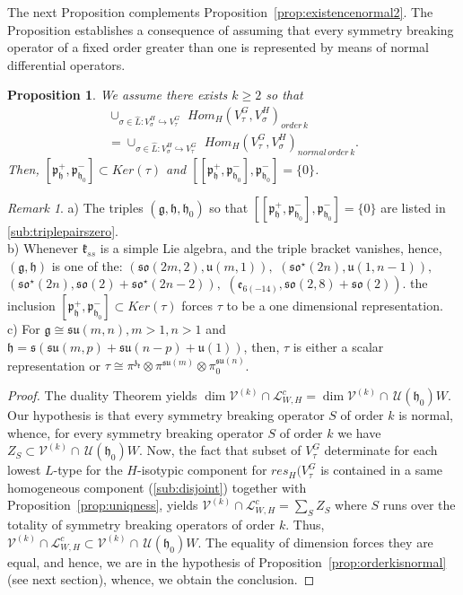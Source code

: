 \documentclass[12pt]{amsart}
\newtheorem{prop}[thm]{Proposition}
\theoremstyle{definition}
\theoremstyle{remark}
\newtheorem{rmk}[thm]{Remark}
\newcommand{\g}{\mathfrak{g}}
\newcommand{\h}{\mathfrak{h}}
\renewcommand{\k}{{\mathfrak k}}
\newcommand{\p}{\mathfrak p}
\newcommand{\s}{\mathfrak s}
\newcommand{\z}{\mathfrak z}
\renewcommand{\u}{{\mathfrak u}}
\numberwithin{equation}{section}
\begin{document}
\smallskip
The next Proposition complements Proposition~\ref{prop:existencenormal2}.
  The Proposition  establishes a   consequence of assuming that every symmetry breaking operator of a fixed order greater than one is represented by means of normal differential operators.
\begin{prop}\label{prop:everynorfortriple}We assume there exists $k\geq 2$ so that  \begin{multline*} \cup_{\sigma \in \widehat L: V_\sigma^H \hookrightarrow V_\tau^G}\,\,    Hom_H( V_\tau^G, V_\sigma^H)_{order\, k} \\ = \cup_{\sigma \in \widehat L: V_\sigma^H \hookrightarrow V_\tau^G}\,\,    Hom_H( V_\tau^G, V_\sigma^H)_{normal\, order\, k}.\end{multline*}
Then,  $[\p_\h^+, \p_{\h_0}^-] \subset Ker(\tau)$ and $[[\p_\h^+, \p_{\h_0}^-], \p_{\h_0}^-]=\{0\}$.
\end{prop}
\begin{rmk}a) The triples $(\g, \h, \h_0)$ so that $[[\p_\h^+, \p_{\h_0}^-], \p_{\h_0}^-]=\{0\}$ are listed in \ref{sub:triplepairszero}. \\ b) Whenever $\k_{ss}$ is a simple Lie algebra, and the triple bracket vanishes,  hence, $(\g,\h)$ is one of the: $(\mathfrak{so}(2m,2), \mathfrak u(m,1)),$   $(\mathfrak{so}^\star (2n), \mathfrak u(1,n-1)),$ $(\mathfrak{so}^\star(2n),  \mathfrak{so}(2) +\mathfrak{so}^\star(2n-2)),$
$(\mathfrak e_{6(-14)}, \mathfrak{so}(2,8)+\mathfrak{so}(2)).$   the inclusion $[\p_\h^+, \p_{\h_0}^-] \subset Ker(\tau)$  forces   $\tau$ to be a one dimensional representation. \\ c)  For $\g\cong \mathfrak{su}(m,n), m>1,n>1 $ and  $\h=\s(\mathfrak{su}(m,p)+\mathfrak{su}(n-p)+\u(1))$,  then,  $\tau$ is either a scalar representation or $\tau \cong \pi^{\z_\k}\otimes \pi^{\mathfrak{su}(m)}\otimes \pi_0^{\mathfrak{su}(n)}$.
\end{rmk}
\begin{proof} The duality Theorem \cite[Theorem 1]{OV3} \cite[Theorem 4.6]{OV4} yields $\dim \mathcal V^{(k)} \cap \mathcal L_{W,H}^c= \dim \mathcal V^{(k)}\cap \, \mathcal U(\h_0)W$. Our hypothesis is that every symmetry breaking operator $S$ of order $k$ is normal, whence,   for every symmetry breaking operator $S$ of order $k$ we have  $Z_S \subset \mathcal V^{(k)}\cap \, \mathcal U(\h_0)W$. Now, the fact that  subset of $V_\tau^G$ determinate for each lowest $L$-type for the $H$-isotypic component for $res_H(V_\tau^G$ is contained in a same  homogeneous  component (\ref{sub:disjoint}) together with Proposition~\ref{prop:uniqness}, yields $\mathcal V^{(k)} \cap \mathcal L_{W,H}^c=\sum_S Z_S$ where $S$ runs over the totality of symmetry breaking operators of order $k$. Thus,  $\mathcal V^{(k)} \cap \mathcal L_{W,H}^c\subset  \mathcal V^{(k)}\cap \, \mathcal U(\h_0)W$.  The equality of dimension forces they are equal, and hence, we are in the hypothesis of  Proposition~\ref{prop:orderkisnormal} (see next section),     whence, we obtain the conclusion. \end{proof}
\end{document}
